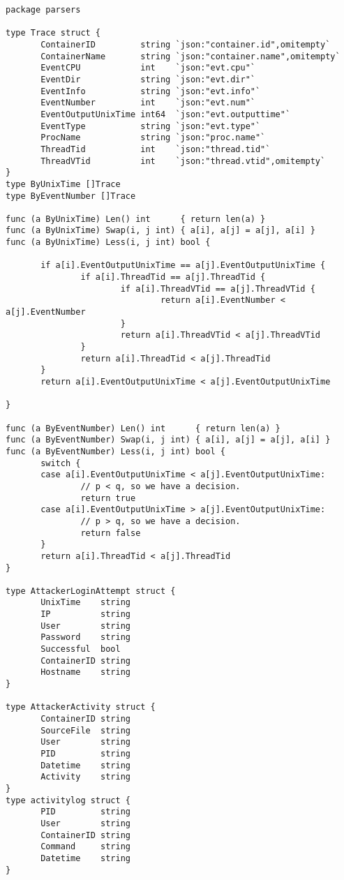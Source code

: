 \begin{verbatim}
package parsers

type Trace struct {
       ContainerID         string `json:"container.id",omitempty`
       ContainerName       string `json:"container.name",omitempty`
       EventCPU            int    `json:"evt.cpu"`
       EventDir            string `json:"evt.dir"`
       EventInfo           string `json:"evt.info"`
       EventNumber         int    `json:"evt.num"`
       EventOutputUnixTime int64  `json:"evt.outputtime"`
       EventType           string `json:"evt.type"`
       ProcName            string `json:"proc.name"`
       ThreadTid           int    `json:"thread.tid"`
       ThreadVTid          int    `json:"thread.vtid",omitempty`
}
type ByUnixTime []Trace
type ByEventNumber []Trace

func (a ByUnixTime) Len() int      { return len(a) }
func (a ByUnixTime) Swap(i, j int) { a[i], a[j] = a[j], a[i] }
func (a ByUnixTime) Less(i, j int) bool {

       if a[i].EventOutputUnixTime == a[j].EventOutputUnixTime {
               if a[i].ThreadTid == a[j].ThreadTid {
                       if a[i].ThreadVTid == a[j].ThreadVTid {
                               return a[i].EventNumber < a[j].EventNumber
                       }
                       return a[i].ThreadVTid < a[j].ThreadVTid
               }
               return a[i].ThreadTid < a[j].ThreadTid
       }
       return a[i].EventOutputUnixTime < a[j].EventOutputUnixTime

}

func (a ByEventNumber) Len() int      { return len(a) }
func (a ByEventNumber) Swap(i, j int) { a[i], a[j] = a[j], a[i] }
func (a ByEventNumber) Less(i, j int) bool {
       switch {
       case a[i].EventOutputUnixTime < a[j].EventOutputUnixTime:
               // p < q, so we have a decision.
               return true
       case a[i].EventOutputUnixTime > a[j].EventOutputUnixTime:
               // p > q, so we have a decision.
               return false
       }
       return a[i].ThreadTid < a[j].ThreadTid
}

type AttackerLoginAttempt struct {
       UnixTime    string
       IP          string
       User        string
       Password    string
       Successful  bool
       ContainerID string
       Hostname    string
}

type AttackerActivity struct {
       ContainerID string
       SourceFile  string
       User        string
       PID         string
       Datetime    string
       Activity    string
}
type activitylog struct {
       PID         string
       User        string
       ContainerID string
       Command     string
       Datetime    string
}

\end{verbatim}

